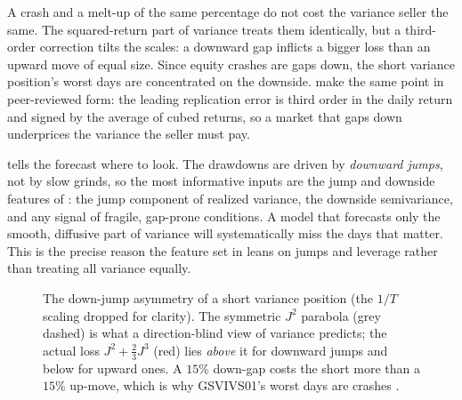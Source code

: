 \begin{intuition}
A crash and a melt-up of the same percentage do not cost the variance seller the same. The squared-return part of variance treats them identically, but a third-order correction tilts the scales: a downward gap inflicts a bigger loss than an upward move of equal size. Since equity crashes are gaps down, the short variance position's worst days are concentrated on the downside. \citet{CarrLee2009} make the same point in peer-reviewed form: the leading replication error is third order in the daily return and signed by the average of cubed returns, so a market that gaps down underprices the variance the seller must pay.
\end{intuition}

\begin{projectconnection}
 tells the forecast where to look. The drawdowns are driven by \emph{downward jumps}, not by slow grinds, so the most informative inputs are the jump and downside features of : the jump component of realized variance, the downside semivariance, and any signal of fragile, gap-prone conditions. A model that forecasts only the smooth, diffusive part of variance will systematically miss the days that matter. This is the precise reason the feature set in  leans on jumps and leverage rather than treating all variance equally.
\end{projectconnection}

\begin{figure}[ht]
\centering
{}
\caption{The down-jump asymmetry of a short variance position (the $1/T$ scaling dropped for clarity). The symmetric $J^2$ parabola (grey dashed) is what a direction-blind view of variance predicts; the actual loss $J^2 + \tfrac23 J^3$ (red) lies \emph{above} it for downward jumps and below for upward ones. A $15\%$ down-gap costs the short more than a $15\%$ up-move, which is why GSVIVS01's worst days are crashes \citep[Table~5, p.~32]{Demeterfi1999}.}
\label{fig:gsvivs:cubic}
\end{figure}


